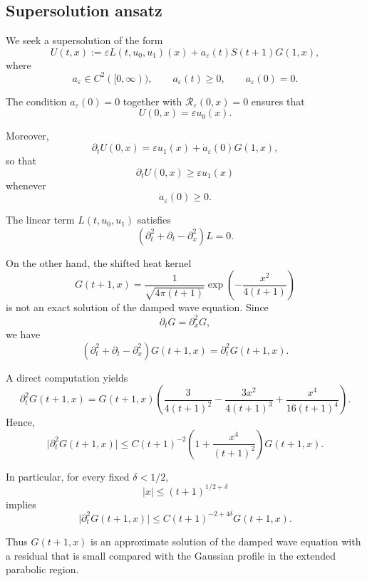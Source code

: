 \documentclass[11pt]{amsart}
\theoremstyle{definition}
\theoremstyle{remark}
\numberwithin{equation}{section}
\begin{document}
\subsection{Supersolution ansatz}


We seek a supersolution of the form
\begin{equation}\label{eq:def-supersolution}
U(t,x)
:=
\varepsilon L(t,u_0,u_1)(x)
+
a_\varepsilon(t)S(t+1)G(1,x),
\end{equation}
where
\[
a_\varepsilon\in C^2([0,\infty)),
\qquad
a_\varepsilon(t)\ge0,
\qquad
a_\varepsilon(0)=0.
\]


The condition \(a_\varepsilon(0)=0\) together with
\(\mathcal R_\varepsilon(0,x)=0\) ensures that
\[
U(0,x)
=
\varepsilon u_0(x).
\]

Moreover,
\[
\partial_tU(0,x)
=
\varepsilon u_1(x)
+
\dot a_\varepsilon(0)G(1,x),
\]
so that
\[
\partial_tU(0,x)
\ge
\varepsilon u_1(x)
\]
whenever
\[
\dot a_\varepsilon(0)\ge0.
\]

The linear term \(L(t,u_0,u_1)\) satisfies
\[
(\partial_t^2+\partial_t-\partial_x^2)L=0.
\]

On the other hand, the shifted heat kernel
\[
G(t+1,x)
=
\frac1{\sqrt{4\pi(t+1)}}
\exp\!\left(
-\frac{x^2}{4(t+1)}
\right)
\]
is not an exact solution of the damped wave equation. Since
\[
\partial_tG=\partial_x^2G,
\]
we have
\begin{equation}\label{eq:heat-kernel-residual}
(\partial_t^2+\partial_t-\partial_x^2)G(t+1,x)
=
\partial_t^2G(t+1,x).
\end{equation}

A direct computation yields
\begin{equation}\label{eq:heat-kernel-second-time-derivative}
\partial_t^2G(t+1,x)
=
G(t+1,x)
\left(
\frac{3}{4(t+1)^2}
-\frac{3x^2}{4(t+1)^3}
+\frac{x^4}{16(t+1)^4}
\right).
\end{equation}
Hence,
\begin{equation}\label{eq:heat-kernel-residual-bound}
\bigl|\partial_t^2G(t+1,x)\bigr|
\le
C(t+1)^{-2}
\left(
1+\frac{x^4}{(t+1)^2}
\right)
G(t+1,x).
\end{equation}

In particular, for every fixed \(\delta<1/2\),
\[
|x|\le (t+1)^{1/2+\delta}
\]
implies
\[
\bigl|\partial_t^2G(t+1,x)\bigr|
\le
C(t+1)^{-2+4\delta}
G(t+1,x).
\]

Thus \(G(t+1,x)\) is an approximate solution of the damped wave equation
with a residual that is small compared with the Gaussian profile in the
extended parabolic region.
\end{document}
